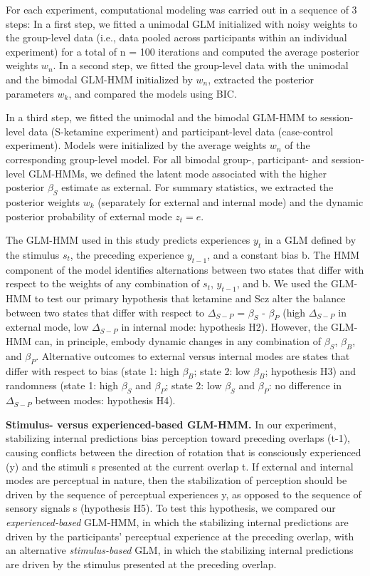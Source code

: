 \documentclass[
]{article}
\begin{document}
For each experiment, computational modeling was carried out in a
sequence of 3 steps: In a first step, we fitted a unimodal GLM
initialized with noisy weights to the group-level data (i.e., data
pooled across participants within an individual experiment) for a total
of n = 100 iterations and computed the average posterior weights
\(w_n\). In a second step, we fitted the group-level data with the
unimodal and the bimodal GLM-HMM initialized by \(w_n\), extracted the
posterior parameters \(w_k\), and compared the models using BIC.

In a third step, we fitted the unimodal and the bimodal GLM-HMM to
session-level data (S-ketamine experiment) and participant-level data
(case-control experiment). Models were initialized by the average
weights \(w_n\) of the corresponding group-level model. For all bimodal
group-, participant- and session-level GLM-HMMs, we defined the latent
mode associated with the higher posterior \(\beta_S\) estimate as
external. For summary statistics, we extracted the posterior weights
\(w_k\) (separately for external and internal mode) and the dynamic
posterior probability of external mode \(z_t = e\).

The GLM-HMM used in this study predicts experiences \(y_t\) in a GLM
defined by the stimulus \(s_t\), the preceding experience \(y_{t-1}\),
and a constant bias b. The HMM component of the model identifies
alternations between two states that differ with respect to the weights
of any combination of \(s_t\), \(y_{t-1}\), and b. We used the GLM-HMM
to test our primary hypothesis that ketamine and Scz alter the balance
between two states that differ with respect to \(\Delta_{S-P}\) =
\(\beta_S\) - \(\beta_P\) (high \(\Delta_{S-P}\) in external mode, low
\(\Delta_{S-P}\) in internal mode: hypothesis H2). However, the GLM-HMM
can, in principle, embody dynamic changes in any combination of
\(\beta_S\), \(\beta_B\), and \(\beta_P\). Alternative outcomes to
external versus internal modes are states that differ with respect to
bias (state 1: high \(\beta_B\); state 2: low \(\beta_B\); hypothesis
H3) and randomness (state 1: high \(\beta_S\) and \(\beta_P\); state 2:
low \(\beta_S\) and \(\beta_P\): no difference in \(\Delta_{S-P}\)
between modes: hypothesis H4).

\textbf{Stimulus- versus experienced-based GLM-HMM.} In our experiment,
stabilizing internal predictions bias perception toward preceding
overlaps (t-1), causing conflicts between the direction of rotation that
is consciously experienced (y) and the stimuli s presented at the
current overlap t. If external and internal modes are perceptual in
nature, then the stabilization of perception should be driven by the
sequence of perceptual experiences y, as opposed to the sequence of
sensory signals s (hypothesis H5). To test this hypothesis, we compared
our \emph{experienced-based} GLM-HMM, in which the stabilizing internal
predictions are driven by the participants' perceptual experience at the
preceding overlap, with an alternative \emph{stimulus-based} GLM, in
which the stabilizing internal predictions are driven by the stimulus
presented at the preceding overlap.
\end{document}
